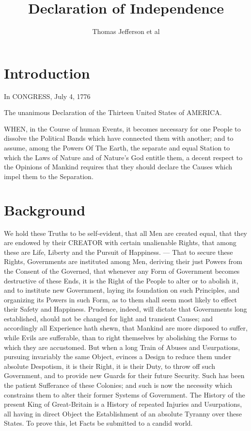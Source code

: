 

\title{Declaration of Independence}
\author{Thomas Jefferson et al}
\date{}

\maketitle
\acmblank{}



\section{Introduction}
In CONGRESS, July 4, 1776

The unanimous Declaration of the Thirteen United States of AMERICA.

WHEN, in the Course of human Events, it becomes necessary for one People to dissolve the Political Bands which have connected them with another; and to assume, among the Powers Of The Earth, the separate and equal Station to which the Laws of Nature and of Nature's God entitle them, a decent respect to the Opinions of Mankind requires that they should declare the Causes which impel them to the Separation.

\section{Background}

We hold these Truths to be self-evident, that all Men are created equal, that they are endowed by their CREATOR with certain unalienable Rights, that among these are Life, Liberty and the Pursuit of Happiness. — That to secure these Rights, Governments are instituted among Men, deriving their just Powers from the Consent of the Governed, that whenever any Form of Government becomes destructive of these Ends, it is the Right of the People to alter or to abolish it, and to institute new Government, laying its foundation on such Principles, and organizing its Powers in such Form, as to them shall seem most likely to effect their Safety and Happiness. Prudence, indeed, will dictate that Governments long established, should not be changed for light and transient Causes; and accordingly all Experience hath shewn, that Mankind are more disposed to suffer, while Evils are sufferable, than to right themselves by abolishing the Forms to which they are accustomed. But when a long Train of Abuses and Usurpations, pursuing invariably the same Object, evinces a Design to reduce them under absolute Despotism, it is their Right, it is their Duty, to throw off such Government, and to provide new Guards for their future Security. Such has been the patient Sufferance of these Colonies; and such is now the necessity which constrains them to alter their former Systems of Government. The History of the present King of Great-Britain is a History of repeated Injuries and Usurpations, all having in direct Object the Establishment of an absolute Tyranny over these States. To prove this, let Facts be submitted to a candid world.


